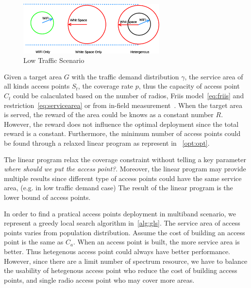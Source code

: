 \begin{figure}
\centering
\includegraphics[width=74mm]{figures/lowtraffic}
\vspace{-0.1in}
\caption{Low Traffic Scenario}                                                                 
\label{fig:drivemap}
\vspace{-0.1in}
\end{figure}

Given a target area $G$ with the traffic demand distribution $\gamma$, the service area 
of all kinds access points $S_t$, the coverage rate $p$, thus the capacity of access point $C_t$ could 
be calaculated based on the number of radios, Friis model~\ref{eq:friis} and restriction~\ref{eq:servicearea}
or from in-field measurement~\cite{cuileveraging}. When the target area is served, the reward of the area 
could be knows as a constant number $R$. However, the reward does not influence the optimal deployment since 
the total reward is a constant. Furthermore, the minimum number of access points could be found through 
a relaxed linear program as represent in ~\ref{opt:opt}. 



The linear program relax the coverage constraint without telling a key parameter
{\it where should we put the access point?}. Moreover, the linear program may provide 
multiple results since different type of access points could have the same service area, 
(e.g. in low traffic demand case) The result of the linear program is the lower bound of 
access points. 

In order to find a pratical access points deployment in multiband scenario, we represent 
a greedy local search algorithm in~\ref{alg:gls}. The service area of access points varies 
from population distribution. Assume the cost of building an access point is the same as $C_a$. 
When an access point is built, the more service area is better. Thus hetegenous access point
could always have better performance. However, since there are a limit number of spectrum resource,
we have to balance the usability of hetegenous access point who reduce the cost of building access 
points, and single radio access point who may cover more areas.

